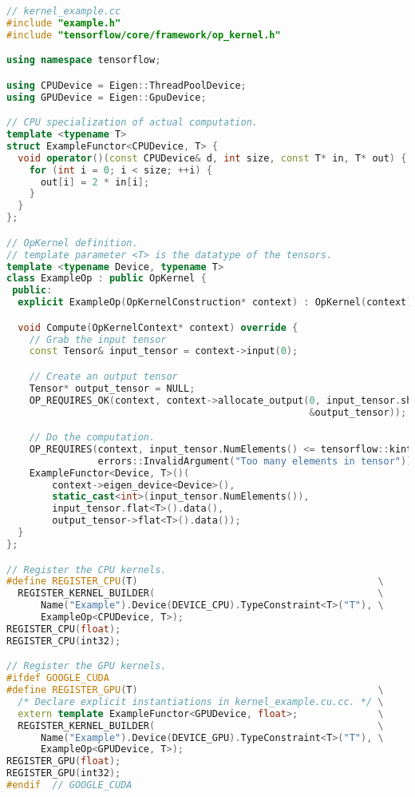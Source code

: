\begin{lstlisting}[language=C++]
// kernel_example.cc
#include "example.h"
#include "tensorflow/core/framework/op_kernel.h"

using namespace tensorflow;

using CPUDevice = Eigen::ThreadPoolDevice;
using GPUDevice = Eigen::GpuDevice;

// CPU specialization of actual computation.
template <typename T>
struct ExampleFunctor<CPUDevice, T> {
  void operator()(const CPUDevice& d, int size, const T* in, T* out) {
    for (int i = 0; i < size; ++i) {
      out[i] = 2 * in[i];
    }
  }
};

// OpKernel definition.
// template parameter <T> is the datatype of the tensors.
template <typename Device, typename T>
class ExampleOp : public OpKernel {
 public:
  explicit ExampleOp(OpKernelConstruction* context) : OpKernel(context) {}

  void Compute(OpKernelContext* context) override {
    // Grab the input tensor
    const Tensor& input_tensor = context->input(0);

    // Create an output tensor
    Tensor* output_tensor = NULL;
    OP_REQUIRES_OK(context, context->allocate_output(0, input_tensor.shape(),
                                                     &output_tensor));

    // Do the computation.
    OP_REQUIRES(context, input_tensor.NumElements() <= tensorflow::kint32max,
                errors::InvalidArgument("Too many elements in tensor"));
    ExampleFunctor<Device, T>()(
        context->eigen_device<Device>(),
        static_cast<int>(input_tensor.NumElements()),
        input_tensor.flat<T>().data(),
        output_tensor->flat<T>().data());
  }
};

// Register the CPU kernels.
#define REGISTER_CPU(T)                                          \
  REGISTER_KERNEL_BUILDER(                                       \
      Name("Example").Device(DEVICE_CPU).TypeConstraint<T>("T"), \
      ExampleOp<CPUDevice, T>);
REGISTER_CPU(float);
REGISTER_CPU(int32);

// Register the GPU kernels.
#ifdef GOOGLE_CUDA
#define REGISTER_GPU(T)                                          \
  /* Declare explicit instantiations in kernel_example.cu.cc. */ \
  extern template ExampleFunctor<GPUDevice, float>;              \
  REGISTER_KERNEL_BUILDER(                                       \
      Name("Example").Device(DEVICE_GPU).TypeConstraint<T>("T"), \
      ExampleOp<GPUDevice, T>);
REGISTER_GPU(float);
REGISTER_GPU(int32);
#endif  // GOOGLE_CUDA

\end{lstlisting}
